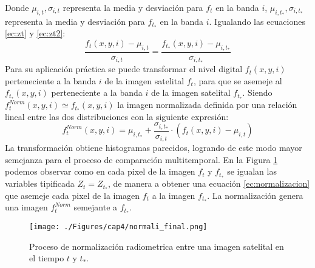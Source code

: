 Donde $ \mu_{i,t},\sigma_{i,t} $ representa la media y desviaci\'on para $ f_{t} $ en la banda $ i $, $ \mu_{i,t_{*}},\sigma_{i,t_{*}} $ representa la media y desviaci\'on para $ f_{t_{*}} $ en la banda $ i $. Igualando las ecuaciones \ref{ec:zt} y \ref{ec:zt2}:
\begin{equation}
\dfrac{f_{t}(x,y,i)-\mu_{i,t}}{\sigma_{i,t}}=\dfrac{f_{t_{*}}(x,y,i)-\mu_{i,t_{*}}}{\sigma_{i,t_{*}}}
\end{equation}
Para su aplicaci\'on pr\'actica se puede transformar el nivel digital $ f_{t}(x,y,i) $ perteneciente a la banda $ i $ de la imagen satelital $ f_{t} $, para que se asemeje al $ f_{t_{*}}(x,y,i) $ perteneciente a la banda $ i $ de la imagen satelital $ f_{t_{*}} $. Siendo $ f_{t}^{Norm}(x,y,i) \simeq  f_{t_{*}}(x,y,i)$ la imagen normalizada definida por una relaci\'on lineal entre las dos distribuciones con la siguiente expresi\'on:
\begin{equation}\label{ec:normalizacion}
f_{t}^{Norm}(x,y,i)=\mu_{i,t_{*}}+\dfrac{\sigma_{i,t_*}}{\sigma_{i,t}}\cdot(f_{t}(x,y,i)-\mu_{i,t})
\end{equation}
La transformaci\'on obtiene histogramas parecidos, logrando de este modo mayor semejanza para el proceso de comparaci\'on multitemporal. En la Figura \ref{fig:normProceso} podemos observar como en cada pixel de la imagen $ f_{t} $ y $ f_{t_{*}} $ se igualan las variables tipificada $ Z_{t} = Z_{t_{*}} $, de manera a obtener una ecuaci\'on \ref{ec:normalizacion} que asemeje cada pixel de la imagen $ f_{t} $ a la imagen $ f_{t_{*}} $. La normalizaci\'on genera una imagen $ f_{t}^{Norm} $ semejante a $ f_{t_{*}} $.
\begin{figure}[H]
	\centering
	\texttt{[image: ./Figures/cap4/normali\_final.png]}
	\caption{Proceso de normalizaci\'on radiometrica entre una imagen satelital en el tiempo $ t $ y $ t_* $.}
	\label{fig:normProceso}
\end{figure}

